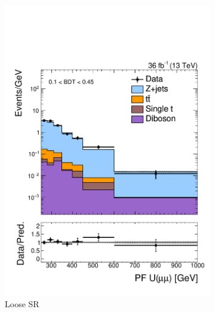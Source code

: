 \begin{figure}[!ht]
    \begin{center}
        \begin{subfigure}[t]{0.49\textwidth}
            \includegraphics[width=\textwidth]{figures/monotop/prefit/dimuon_loose_pfUZmag_logy.pdf}
            \caption{Loose SR}
        \end{subfigure}
        \begin{subfigure}[t]{0.49\textwidth}

\end{subfigure}
\end{center}
\end{figure}
